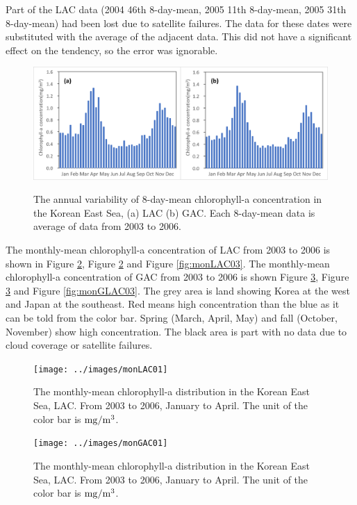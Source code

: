 Part of the LAC data (2004 46th 8-day-mean, 2005 11th 8-day-mean, 2005 31th 8-day-mean) had been lost due to satellite failures. The data for these dates were substituted with the average of the adjacent data. This did not have a significant effect on the tendency, so the error was ignorable.
  
 \begin{figure}[b]
	\centering
	\includegraphics[width=1.0\linewidth]{../images/annualwky}\\
	\caption{The annual variability of 8-day-mean chlorophyll-a concentration in the Korean East Sea, (a) LAC (b) GAC. Each 8-day-mean data is average of data from 2003 to 2006.}
	\label{fig:annualwky}
\end{figure}

  
 
The monthly-mean chlorophyll-a concentration of LAC from 2003 to 2006 is shown in Figure \ref{fig:monLAC01}, Figure \ref{fig:monLAC01} and Figure \ref{fig:monLAC03}. The monthly-mean chlorophyll-a concentration of GAC from 2003 to 2006 is shown Figure \ref{fig:monGAC01}, Figure \ref{fig:monGAC01} and Figure \ref{fig:monGLAC03}. The grey area is land showing Korea at the west and Japan at the southeast. Red means high concentration than the blue as it can be told from the color bar. Spring (March, April, May) and fall (October, November) show high concentration. The black area is part with no data due to cloud coverage or satellite failures. 

\begin{figure}[t]
	\centering
	\texttt{[image: ../images/monLAC01]}\\
	\caption{The monthly-mean chlorophyll-a distribution in the Korean East Sea, LAC. From 2003 to 2006, January to April. The unit of the color bar is $\rm mg/m^3$.}
	\label{fig:monLAC01}
\end{figure}
    
\begin{figure}[p]
	\centering
	\texttt{[image: ../images/monGAC01]}\\
	\caption{The monthly-mean chlorophyll-a distribution in the Korean East Sea, LAC. From 2003 to 2006, January to April. The unit of the color bar is $\rm mg/m^3$.}
	\label{fig:monGAC01}
\end{figure}


